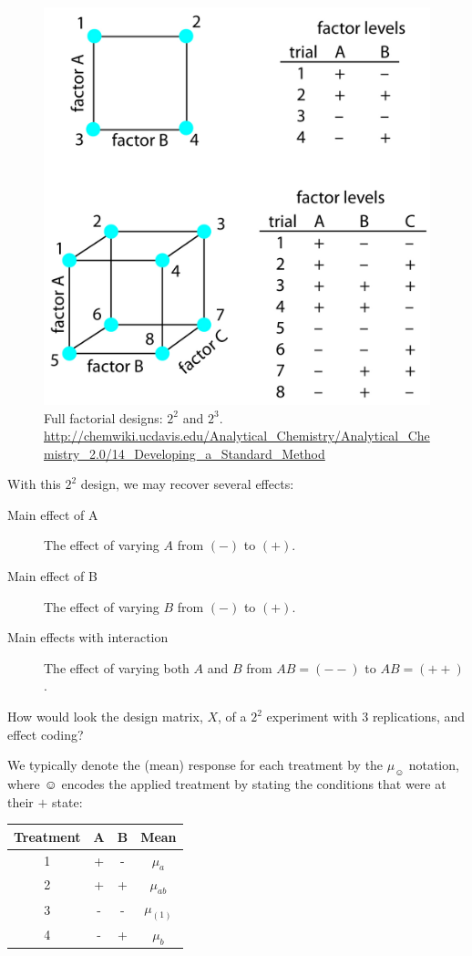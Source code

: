 \begin{figure}[H]
\centering
\includegraphics[width=0.7\linewidth, height=0.3\textheight]{art/full_factorial}
\caption[Full Factorial Design]{Full factorial designs: $2^2$ and $2^3$. \newline \url{http://chemwiki.ucdavis.edu/Analytical_Chemistry/Analytical_Chemistry_2.0/14_Developing_a_Standard_Method}}
\label{fig:full_factorial}
\end{figure}
With this $2^2$ design, we may recover several effects:
\begin{description}
\item [Main effect of A] The effect of varying $A$ from $(-)$ to $(+)$.
\item [Main effect of B] The effect of varying $B$ from $(-)$ to $(+)$.
\item [Main effects with interaction] The effect of varying both $A$ and $B$ from $AB=(--)$ to $AB=(++)$.
\end{description}

\begin{think}
	How would look the design matrix, $X$, of a $2^2$ experiment with $3$ replications, and effect coding?
\end{think}

We typically denote the (mean) response for each treatment by the $\mu_{\smiley}$ notation, where $\smiley$ encodes the applied treatment by stating the conditions that were at their $+$ state:
\begin{table}[H]
\centering
\begin{tabular}{|c|c|c|c|}
\hline Treatment & A & B & Mean \\ 
\hline 1 & + & - & $\mu_a$ \\ 
\hline 2 & + & + & $\mu_{ab}$ \\ 
\hline 3 & - & - & $\mu_{(1)}$ \\ 
\hline 4 & - & + & $\mu_b$ \\ 
\hline 
\end{tabular} 
\end{table}

